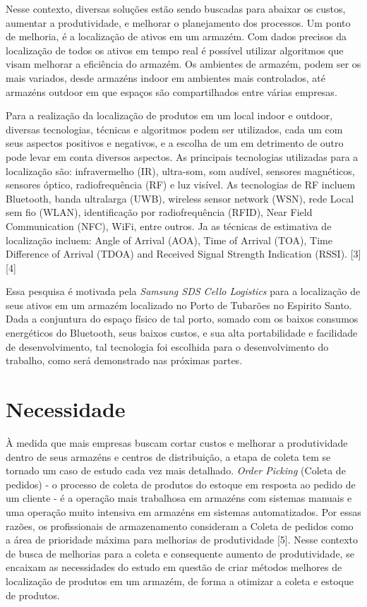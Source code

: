 \documentclass[]{politex}
\begin{document}
Nesse contexto, diversas soluções estão sendo buscadas para abaixar os custos, aumentar a produtividade, e melhorar o planejamento dos processos.
Um ponto de melhoria, é a localização de ativos em um armazém. Com dados precisos da localização de todos os ativos em tempo real é possível utilizar algoritmos que visam melhorar a eficiência do armazém.
Os ambientes de armazém, podem ser os mais variados, desde armazéns indoor em ambientes mais controlados, até armazéns outdoor em que espaços são compartilhados entre várias empresas.

Para a realização da localização de produtos em um local indoor e outdoor, diversas tecnologias, técnicas e algoritmos podem ser utilizados, cada um com seus aspectos positivos e negativos, e a escolha de um em detrimento de outro pode levar em conta diversos aspectos. As principais tecnologias utilizadas para a localização são: infravermelho (IR), ultra-som, som audível, sensores magnéticos, sensores óptico, radiofrequência (RF) e luz visível. As tecnologias de RF incluem Bluetooth, banda ultralarga (UWB), wireless sensor network (WSN), rede Local sem fio (WLAN), identificação por radiofrequência (RFID), Near Field Communication (NFC), WiFi, entre outros.
Ja as técnicas de estimativa de localização incluem: Angle of Arrival (AOA), Time of Arrival (TOA), Time Difference of Arrival (TDOA) and Received Signal Strength Indication (RSSI).  [3][4]

Essa pesquisa é motivada pela \textit{Samsung SDS Cello Logistics} para a localização de seus ativos em um armazém localizado no Porto de Tubarões no Espirito Santo. Dada a conjuntura do espaço físico de tal porto, somado com os baixos consumos energéticos do Bluetooth, seus baixos custos, e sua alta portabilidade e facilidade de desenvolvimento, tal tecnologia foi escolhida para o desenvolvimento do trabalho, como será demonstrado nas próximas partes.

\chapter{Necessidade}
À medida que mais empresas buscam cortar custos e melhorar a produtividade dentro de seus armazéns e centros de distribuição, a etapa de coleta tem se tornado um caso de estudo cada vez mais detalhado. \textit{Order Picking} (Coleta de pedidos) - o processo de coleta de produtos do estoque em resposta ao pedido de um cliente - é a operação mais trabalhosa em armazéns com sistemas manuais e uma operação muito intensiva em armazéns em sistemas automatizados. Por essas razões, os profissionais de armazenamento consideram a Coleta de pedidos como a área de prioridade máxima para melhorias de produtividade [5].
Nesse contexto de busca de melhorias para a coleta e consequente aumento de produtividade, se encaixam as necessidades do estudo em questão de criar métodos melhores de localização de produtos em um armazém, de forma a otimizar a coleta e estoque de produtos.
\end{document}
